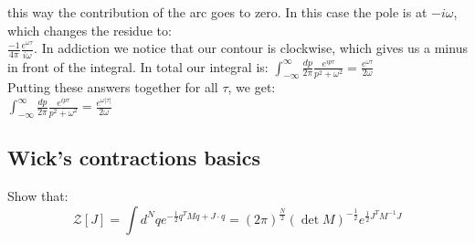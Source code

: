 \documentclass{article}
\begin{document}

this way the contribution of the arc goes to zero. In this case the pole is at $-i\omega$, which changes the residue to:\\
$\frac{-1}{4\pi}\frac{e^{\omega\tau}}{i\omega}$. In addiction we notice that our contour is clockwise, which gives us a minus in front of the integral. In total our integral is:
$\int_{-\infty}^{\infty}\frac{dp}{2\pi}\frac{e^{ip\tau}}{p^2+\omega^2}=\frac{e^{\omega\tau}}{2\omega}$\\
Putting these answers together for all $\tau$, we get:\\
$\boxed{\int_{-\infty}^{\infty}\frac{dp}{2\pi}\frac{e^{ip\tau}}{p^2+\omega^2}=\frac{e^{\omega|\tau|}}{2\omega}}$\\
\subsection*{Wick's contractions basics}
Show that:
\begin{equation} \label{eq:zed}
\mathcal{Z}[J]=\int d^N q e^{-\frac{1}{2} q^T M q+J \cdot q}=(2 \pi)^{\frac{N}{2}}(\operatorname{det} M)^{-\frac{1}{2}} e^{\frac{1}{2} J^T M^{-1} J} 
\end{equation}
\end{document}

